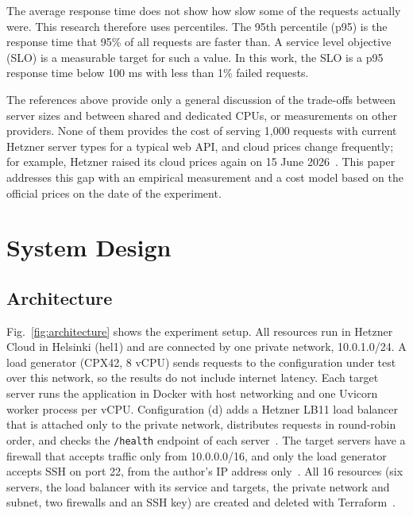 \documentclass[conference,a4paper]{IEEEtran}
\begin{document}
The average response time does not show how slow some of the requests actually were. This research therefore uses percentiles. The 95th percentile (p95) is the response time that 95\% of all requests are faster than. A service level objective (SLO) is a measurable target for such a value. In this work, the SLO is a p95 response time below 100 ms with less than 1\% failed requests.

The references above provide only a general discussion of the trade-offs between server sizes and between shared and dedicated CPUs, or measurements on other providers. None of them provides the cost of serving 1,000 requests with current Hetzner server types for a typical web API, and cloud prices change frequently; for example, Hetzner raised its cloud prices again on 15 June 2026~\cite{hz-price}. This paper addresses this gap with an empirical measurement and a cost model based on the official prices on the date of the experiment.

\section{System Design}
\label{sec:design}

\subsection{Architecture}

Fig.~\ref{fig:architecture} shows the experiment setup. All resources run in Hetzner Cloud in Helsinki (hel1) and are connected by one private network, 10.0.1.0/24. A load generator (CPX42, 8 vCPU) sends requests to the configuration under test over this network, so the results do not include internet latency. Each target server runs the application in Docker with host networking and one Uvicorn worker process per vCPU. Configuration (d) adds a Hetzner LB11 load balancer that is attached only to the private network, distributes requests in round-robin order, and checks the \texttt{/health} endpoint of each server~\cite{hz-lb}. The target servers have a firewall that accepts traffic only from 10.0.0.0/16, and only the load generator accepts SSH on port 22, from the author's IP address only~\cite{hz-fw}. All 16 resources (six servers, the load balancer with its service and targets, the private network and subnet, two firewalls and an SSH key) are created and deleted with Terraform~\cite{tf-hcloud}.
\end{document}
